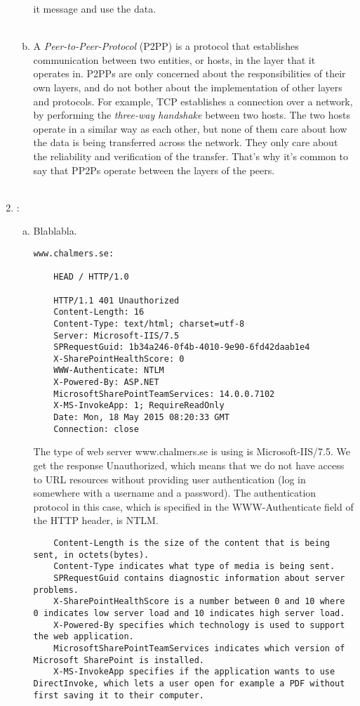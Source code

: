 \documentclass[a4paper,9pt,fleqn]{article}
\begin{document}
\begin{enumerate}[{Task} 1]
\begin{enumerate}[a)]
it message and use the data. 
\\
\\ 
\item 
A {\it Peer-to-Peer-Protocol} (P2PP) is a protocol that establishes communication
between two entities, or hosts, in the layer that it operates in. P2PPs are
only concerned about the responsibilities of their own layers, and do not bother
about the implementation of other layers and protocols. For example, TCP
establishes a connection over a network, by performing the {\it three-way handshake}
between two hosts. The two hosts operate in a similar way as each other, but none
of them care about how the data is being transferred across the network. They only
care about the reliability and verification of the transfer. That's why it's common
to say that PP2Ps operate between the layers of the peers.
\\
\\
\end{enumerate}

\item :
\begin{enumerate}[a)]
\item
Blablabla.

\begin{lstlisting}
www.chalmers.se:

	HEAD / HTTP/1.0

	HTTP/1.1 401 Unauthorized
	Content-Length: 16
	Content-Type: text/html; charset=utf-8
	Server: Microsoft-IIS/7.5
	SPRequestGuid: 1b34a246-0f4b-4010-9e90-6fd42daab1e4
	X-SharePointHealthScore: 0
	WWW-Authenticate: NTLM
	X-Powered-By: ASP.NET
	MicrosoftSharePointTeamServices: 14.0.0.7102
	X-MS-InvokeApp: 1; RequireReadOnly
	Date: Mon, 18 May 2015 08:20:33 GMT
	Connection: close
\end{lstlisting}	

The type of web server {\outp www.chalmers.se} is using is {\outp Microsoft-IIS/7.5}.
We get the response { Unauthorized}, which means that we do not have access
to URL resources without providing user authentication (log in somewhere with
a username and a password). The authentication protocol in this case, which
is specified in the {\outp WWW-Authenticate} field of the HTTP header, is {\outp NTLM}.

\begin{lstlisting}
	Content-Length is the size of the content that is being sent, in octets(bytes).
	Content-Type indicates what type of media is being sent.
	SPRequestGuid contains diagnostic information about server problems.
	X-SharePointHealthScore is a number between 0 and 10 where 0 indicates low server load and 10 indicates high server load.
	X-Powered-By specifies which technology is used to support the web application.
	MicrosoftSharePointTeamServices indicates which version of Microsoft SharePoint is installed.
	X-MS-InvokeApp specifies if the application wants to use DirectInvoke, which lets a user open for example a PDF without first saving it to their computer. 
\end{lstlisting}


\end{enumerate}
\end{enumerate}
\end{document}
